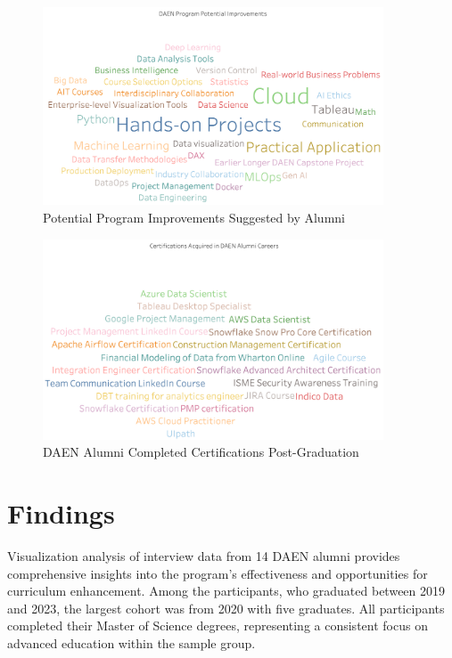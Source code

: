 \documentclass[12pt,a4paper]{article}
\begin{document}
\begin{figure}[H]
    \centering
    \includegraphics[width=0.9\textwidth]{visualizations/potential-improvements.png}
    \caption{Potential Program Improvements Suggested by Alumni}
    \label{fig:potential-improvements}
\end{figure}

\begin{figure}[H]
    \centering
    \includegraphics[width=0.9\textwidth]{visualizations/daen-alumni-completed-certs.png}
    \caption{DAEN Alumni Completed Certifications Post-Graduation}
    \label{fig:completed-certifications}
\end{figure}

\section{Findings}
Visualization analysis of interview data from 14 DAEN alumni provides comprehensive insights into the program's effectiveness and opportunities for curriculum enhancement. Among the participants, who graduated between 2019 and 2023, the largest cohort was from 2020 with five graduates. All participants completed their Master of Science degrees, representing a consistent focus on advanced education within the sample group.
\end{document}
